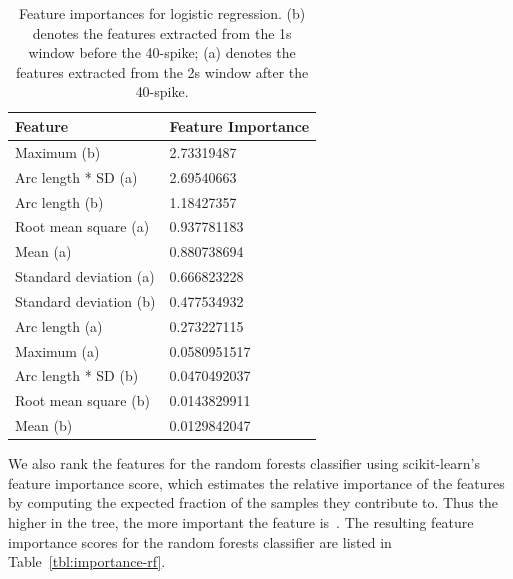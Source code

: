 \begin{table}[t]
\centering
\begin{tabular}{@{}ll@{}}
\toprule
Feature                & Feature Importance \\ \midrule
Maximum (b)            & 2.73319487         \\
Arc length * SD (a)    & 2.69540663         \\
Arc length (b)         & 1.18427357         \\
Root mean square (a)   & 0.937781183        \\
Mean (a)               & 0.880738694        \\
Standard deviation (a) & 0.666823228        \\
Standard deviation (b) & 0.477534932        \\
Arc length (a)         & 0.273227115        \\
Maximum (a)            & 0.0580951517       \\
Arc length * SD (b)    & 0.0470492037       \\
Root mean square (b)   & 0.0143829911       \\
Mean (b)               & 0.0129842047       \\ \bottomrule
\end{tabular}
\caption{Feature importances for logistic regression. (b) denotes the features extracted from the 1s window before the 40-spike; (a) denotes the features extracted from the 2s window after the 40-spike.}
\label{tbl:importance-lr}
\end{table}

We also rank the features for the random forests classifier using scikit-learn's feature importance score, which estimates the relative importance of the features by computing the expected fraction of the samples they contribute to. 
Thus the higher in the tree, the more important the feature is~\cite{sklearn:rfdoc}. 
The resulting feature importance scores for the random forests classifier are listed in Table~\ref{tbl:importance-rf}.


